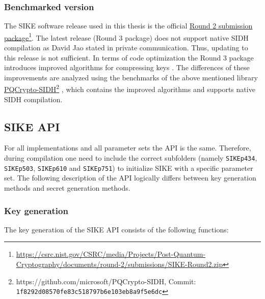 \subsubsection{Benchmarked version}
The \gls{SIKE} software release used in this thesis is the official \href{https://csrc.nist.gov/CSRC/media/Projects/Post-Quantum-Cryptography/documents/round-2/submissions/SIKE-Round2.zip}{Round 2 submission package}\footnote{\url{https://csrc.nist.gov/CSRC/media/Projects/Post-Quantum-Cryptography/documents/round-2/submissions/SIKE-Round2.zip}}. The latest release (Round 3 package) does not support native SIDH compilation as David Jao stated in private communication. Thus, updating to this release is not sufficient. In terms of code optimization the Round 3 package introduces improved algorithms for compressing keys \parencite{sike2020spec}. The differences of these improvements are analyzed using the benchmarks of the above mentioned library 
\href{https://github.com/microsoft/PQCrypto-SIDH}{PQCrypto-SIDH}\footnote{https://github.com/microsoft/PQCrypto-SIDH, Commit: \texttt{1f8292d08570fe83c518797b6e103eb8a9f5e6dc}}
, which contains the improved algorithms and supports native SIDH compilation.
\subsection{\gls{SIKE} API}
For all implementations and all parameter sets the API is the same. Therefore, during compilation one need to include the correct subfolders (namely \texttt{SIKEp434}, \texttt{SIKEp503}, \texttt{SIKEp610} and \texttt{SIKEp751}) to initialize \gls{SIKE} with a specific parameter set. The following description of the API logically differs between key generation methods and secret generation methods.
\newpage
\subsubsection{Key generation}

The key generation of the \gls{SIKE} API consists of the following functions:


